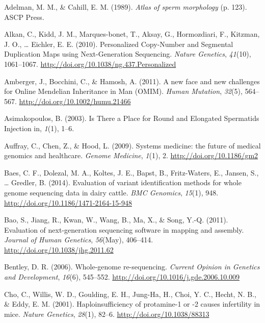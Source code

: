 \documentclass[12pt,twoside]{reedthesis}
\theoremstyle{definition}
\theoremstyle{definition}
\theoremstyle{remark}
\begin{document}
  \noindent
  
  \setlength{\parindent}{-0.20in} \setlength{\leftskip}{0.20in}
  \setlength{\parskip}{8pt}
  
  \hypertarget{refs}{}
  \hypertarget{ref-Adelman1989}{}
  Adelman, M. M., \& Cahill, E. M. (1989). \emph{Atlas of sperm
  morphology} (p. 123). ASCP Press.
  
  \hypertarget{ref-Alkan2010}{}
  Alkan, C., Kidd, J. M., Marques-bonet, T., Aksay, G., Hormozdiari, F.,
  Kitzman, J. O., \ldots{} Eichler, E. E. (2010). Personalized Copy-Number
  and Segmental Duplication Maps using Next-Generation Sequencing.
  \emph{Nature Genetics}, \emph{41}(10), 1061--1067.
  \url{http://doi.org/10.1038/ng.437.Personalized}
  
  \hypertarget{ref-Amberger2011}{}
  Amberger, J., Bocchini, C., \& Hamosh, A. (2011). A new face and new
  challenges for Online Mendelian Inheritance in Man (OMIM). \emph{Human
  Mutation}, \emph{32}(5), 564--567.
  \url{http://doi.org/10.1002/humu.21466}
  
  \hypertarget{ref-Asimakopoulos2003}{}
  Asimakopoulos, B. (2003). Is There a Place for Round and Elongated
  Spermatids Injection in, \emph{1}(1), 1--6.
  
  \hypertarget{ref-Auffray2009}{}
  Auffray, C., Chen, Z., \& Hood, L. (2009). Systems medicine: the future
  of medical genomics and healthcare. \emph{Genome Medicine}, \emph{1}(1),
  2. \url{http://doi.org/10.1186/gm2}
  
  \hypertarget{ref-Baes2014}{}
  Baes, C. F., Dolezal, M. A., Koltes, J. E., Bapst, B., Fritz-Waters, E.,
  Jansen, S., \ldots{} Gredler, B. (2014). Evaluation of variant
  identification methods for whole genome sequencing data in dairy cattle.
  \emph{BMC Genomics}, \emph{15}(1), 948.
  \url{http://doi.org/10.1186/1471-2164-15-948}
  
  \hypertarget{ref-Bao2011}{}
  Bao, S., Jiang, R., Kwan, W., Wang, B., Ma, X., \& Song, Y.-Q. (2011).
  Evaluation of next-generation sequencing software in mapping and
  assembly. \emph{Journal of Human Genetics}, \emph{56}(May), 406--414.
  \url{http://doi.org/10.1038/jhg.2011.62}
  
  \hypertarget{ref-Bentley2006}{}
  Bentley, D. R. (2006). Whole-genome re-sequencing. \emph{Current Opinion
  in Genetics and Development}, \emph{16}(6), 545--552.
  \url{http://doi.org/10.1016/j.gde.2006.10.009}
  
  \hypertarget{ref-Cho2001}{}
  Cho, C., Willis, W. D., Goulding, E. H., Jung-Ha, H., Choi, Y. C.,
  Hecht, N. B., \& Eddy, E. M. (2001). Haploinsufficiency of protamine-1
  or -2 causes infertility in mice. \emph{Nature Genetics}, \emph{28}(1),
  82--6. \url{http://doi.org/10.1038/88313}
  
\end{document}
